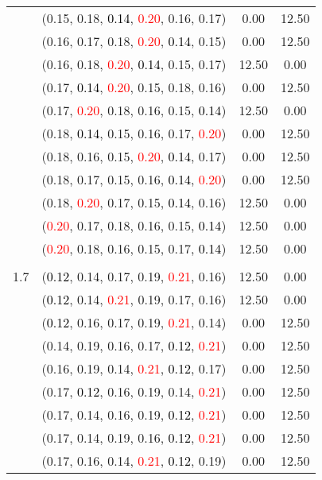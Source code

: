 \documentclass[10pt,a4paper]{report}
\begin{document}
\begin{center}
\begin{longtable}{clcc}
			&(0.15, 0.18, \textcolor{black}{0.14}, \textcolor{red}{0.20}, 0.16, 0.17)&0.00&12.50\\
			&(0.16, 0.17, 0.18, \textcolor{red}{0.20}, \textcolor{black}{0.14}, 0.15)&0.00&12.50\\
			&(0.16, 0.18, \textcolor{red}{0.20}, \textcolor{black}{0.14}, 0.15, 0.17)&12.50&0.00\\
			&(0.17, \textcolor{black}{0.14}, \textcolor{red}{0.20}, 0.15, 0.18, 0.16)&0.00&12.50\\
			&(0.17, \textcolor{red}{0.20}, 0.18, 0.16, 0.15, \textcolor{black}{0.14})&12.50&0.00\\
			&(0.18, \textcolor{black}{0.14}, 0.15, 0.16, 0.17, \textcolor{red}{0.20})&0.00&12.50\\
			&(0.18, 0.16, 0.15, \textcolor{red}{0.20}, \textcolor{black}{0.14}, 0.17)&0.00&12.50\\
			&(0.18, 0.17, 0.15, 0.16, \textcolor{black}{0.14}, \textcolor{red}{0.20})&0.00&12.50\\
			&(0.18, \textcolor{red}{0.20}, 0.17, 0.15, \textcolor{black}{0.14}, 0.16)&12.50&0.00\\
			&(\textcolor{red}{0.20}, 0.17, 0.18, 0.16, 0.15, \textcolor{black}{0.14})&12.50&0.00\\
			&(\textcolor{red}{0.20}, 0.18, 0.16, 0.15, 0.17, \textcolor{black}{0.14})&12.50&0.00\\
		&&&\\
		1.7			&(\textcolor{black}{0.12}, 0.14, 0.17, 0.19, \textcolor{red}{0.21}, 0.16)&12.50&0.00\\
			&(\textcolor{black}{0.12}, 0.14, \textcolor{red}{0.21}, 0.19, 0.17, 0.16)&12.50&0.00\\
			&(\textcolor{black}{0.12}, 0.16, 0.17, 0.19, \textcolor{red}{0.21}, 0.14)&0.00&12.50\\
			&(0.14, 0.19, 0.16, 0.17, \textcolor{black}{0.12}, \textcolor{red}{0.21})&0.00&12.50\\
			&(0.16, 0.19, 0.14, \textcolor{red}{0.21}, \textcolor{black}{0.12}, 0.17)&0.00&12.50\\
			&(0.17, \textcolor{black}{0.12}, 0.16, 0.19, 0.14, \textcolor{red}{0.21})&0.00&12.50\\
			&(0.17, 0.14, 0.16, 0.19, \textcolor{black}{0.12}, \textcolor{red}{0.21})&0.00&12.50\\
			&(0.17, 0.14, 0.19, 0.16, \textcolor{black}{0.12}, \textcolor{red}{0.21})&0.00&12.50\\
			&(0.17, 0.16, 0.14, \textcolor{red}{0.21}, \textcolor{black}{0.12}, 0.19)&0.00&12.50\\

\end{longtable}
\end{center}
\end{document}
